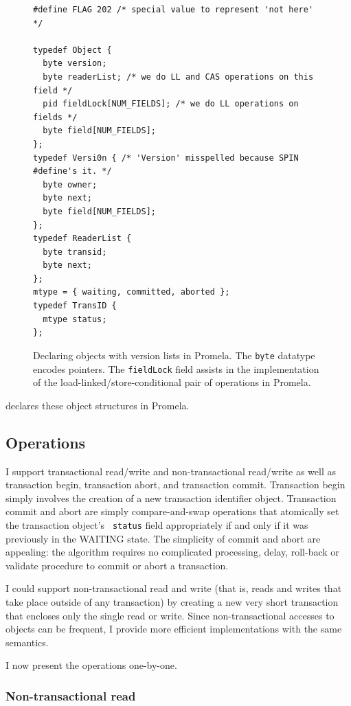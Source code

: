 \begin{figure}
\sis\fontsize{9}{10}
\begin{verbatim}
#define FLAG 202 /* special value to represent 'not here' */

typedef Object {
  byte version;
  byte readerList; /* we do LL and CAS operations on this field */
  pid fieldLock[NUM_FIELDS]; /* we do LL operations on fields */
  byte field[NUM_FIELDS];
};
typedef Versi0n { /* 'Version' misspelled because SPIN #define's it. */
  byte owner;
  byte next;
  byte field[NUM_FIELDS];
};
typedef ReaderList {
  byte transid;
  byte next;
};
mtype = { waiting, committed, aborted };
typedef TransID {
  mtype status;
};
\end{verbatim}
\caption[Declaring objects with version lists in Promela.]
 {Declaring objects with version lists in Promela.
  The \texttt{byte} datatype encodes pointers.
  The \texttt{fieldLock} field assists in the implementation of the
  load-linked/store-conditional pair of operations in Promela.}
\label{fig:promdecl}
\end{figure}

 declares these object structures in Promela.

\subsection{Operations}%
I support transactional read/write and non-transactional read/write
as well as transaction begin, transaction abort, and transaction
commit.  Transaction begin simply involves the creation of a new
transaction identifier object.  Transaction commit and abort are simply
compare-and-swap operations that atomically set the transaction object's {\tt
  status} field appropriately if and only if it was previously in the
WAITING state.
The simplicity of commit and abort are appealing: the \apex algorithm
requires no complicated processing, delay, roll-back or validate
procedure to commit or abort a transaction.

I could support non-transactional read and write (that is,
reads and writes that take place outside of any transaction) by
creating a new very short transaction that encloses only the single
read or write.  Since non-transactional accesses to objects can be
frequent, I provide more efficient implementations with
the same semantics.

I now present the operations one-by-one.

\subsubsection{Non-transactional read}

